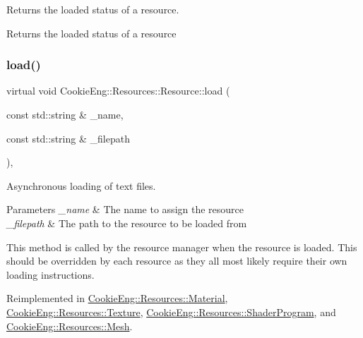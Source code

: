 Returns the loaded status of a resource. 

Returns the loaded status of a resource \mbox{\label{class_cookie_eng_1_1_resources_1_1_resource_a75648b8f2e442bebc90d6eb4ea3a2f6e}} 
\subsubsection{\texorpdfstring{load()}{load()}}
{\footnotesize\ttfamily virtual void Cookie\+Eng\+::\+Resources\+::\+Resource\+::load (\begin{DoxyParamCaption}\item[{const std\+::string \&}]{\+\_\+name,  }\item[{const std\+::string \&}]{\+\_\+filepath }\end{DoxyParamCaption})\hspace{0.3cm}{\ttfamily [inline]}, {\ttfamily [virtual]}}



Asynchronous loading of text files. 


\begin{DoxyParams}{Parameters}
{\em \+\_\+name} & The name to assign the resource \\
\hline
{\em \+\_\+filepath} & The path to the resource to be loaded from\\
\hline
\end{DoxyParams}
This method is called by the resource manager when the resource is loaded. This should be overridden by each resource as they all most likely require their own loading instructions. 

Reimplemented in \hyperlink{class_cookie_eng_1_1_resources_1_1_material_a5d14ee55b9ce265cd557b85efd0e5722}{Cookie\+Eng\+::\+Resources\+::\+Material}, \hyperlink{class_cookie_eng_1_1_resources_1_1_texture_a1f2d72c781dba6262ac5ca6e8898fc8d}{Cookie\+Eng\+::\+Resources\+::\+Texture}, \hyperlink{class_cookie_eng_1_1_resources_1_1_shader_program_aef29916bad667d1f820053fd891d9e58}{Cookie\+Eng\+::\+Resources\+::\+Shader\+Program}, and \hyperlink{struct_cookie_eng_1_1_resources_1_1_mesh_ae31053c6edaf0e735d85350bfa6093fb}{Cookie\+Eng\+::\+Resources\+::\+Mesh}.

\mbox{\label{class_cookie_eng_1_1_resources_1_1_resource_a9ad88ddeec633dbb1df1b6f1f8ff4c47}} 
